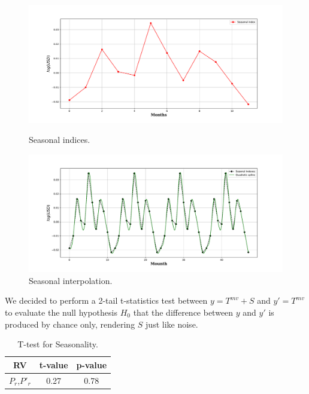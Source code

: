 \begin{figure}[!tbp]
	\centering
	\begin{minipage}[b]{0.49\textwidth}
		\includegraphics[width=\textwidth]{data/seasonal_index.pdf}
		\caption{Seasonal indices.}
	\end{minipage}
	\hfill
	\begin{minipage}[b]{0.49\textwidth}
		\includegraphics[width=\textwidth]{data/seasonal_interpolation.pdf}
		\caption{Seasonal interpolation.}
		\label{fig:seasonal_interpolation}
	\end{minipage}
\end{figure}


We decided to perform a 2-tail t-statistics test between $y=T^{mv}+S$ and $y'=T^{mv}$ to evaluate the null hypothesis $H_{0}$ that the difference between $y$ and $y'$ is produced by chance only, rendering $S$ just like noise.



\begin{table}[h!]
	\begin{center}
		\begin{tabular}{||c c c||} 
			\hline
			RV & t-value & p-value \\ [0.5ex] 
			\hline\hline
			$P_{r}$,$P'_{r}$ & 0.27 & 0.78  \\ 
			\hline
		\end{tabular}
		\caption{T-test for Seasonality.}
		\label{table:t_test}
	\end{center}
\end{table}

